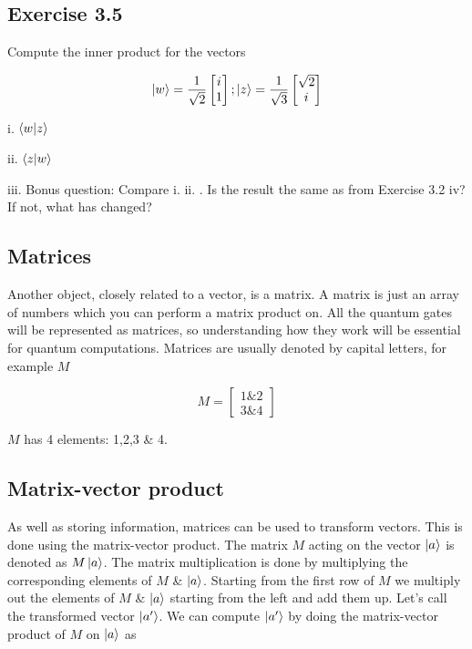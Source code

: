 \documentclass{book}
\begin{document}
\subsection{Exercise 3.5}

Compute the inner product for the vectors 

$$ \ket{w} = \frac{1}{\sqrt{2}} \begin{bmatrix} i \\ 1 \end{bmatrix} ; \ket{z} = \frac{1}{\sqrt{3}} \begin{bmatrix} \sqrt{2} \\ i \end{bmatrix}$$

i. $\braket{w|z}$

ii. $\braket{z|w}$

iii. Bonus question: Compare i. ii. . Is the result the same as from Exercise 3.2 iv? 
If not, what has changed?

\hline

\subsection{ Matrices}

Another object, closely related to a vector, is a matrix. A matrix is just an array of numbers which you can perform a matrix product on. All the quantum gates will be represented as matrices, so understanding how they work will be essential for quantum computations. Matrices are usually denoted by capital letters, for example $M$

$$
M = \begin{bmatrix} 1 \& 2  \\ 3 \& 4 \end{bmatrix}
$$

$M$ has 4 elements: 1,2,3 \& 4. 

\subsection{ Matrix-vector product} 

As well as storing information, matrices can be used to transform vectors. This is done using the matrix-vector product. The matrix $M$ acting on the vector $\ket{a}$ is denoted as $M\ket{a}$. The matrix multiplication is done by multiplying the corresponding elements of $M$ \& $\ket{a}$. Starting from the first row of $M$ we multiply out the elements of $M$ \& $\ket{a}$ starting from the left and add them up. Let's call the transformed vector $\ket{a'}$. We can compute $\ket{a'}$ by doing the matrix-vector product of $M$ on $\ket{a}$ as
\end{document}
